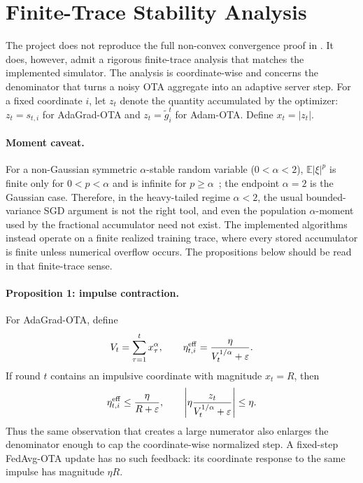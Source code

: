 \section{Finite-Trace Stability Analysis}
\label{sec:finite-trace-stability}
The project does not reproduce the full non-convex convergence proof in
\cite{wang2024adaptive}. It does, however, admit a rigorous finite-trace
analysis that matches the implemented simulator. The analysis is
coordinate-wise and concerns the denominator that turns a noisy OTA
aggregate into an adaptive server step. For a fixed coordinate $i$, let
$z_t$ denote the quantity accumulated by the optimizer: $z_t=s_{t,i}$ for
AdaGrad-OTA and $z_t=\tilde g^t_i$ for Adam-OTA. Define $x_t=|z_t|$.

\paragraph{Moment caveat.}
For a non-Gaussian symmetric $\alpha$-stable random variable
($0<\alpha<2$), $\mathbb{E}|\xi|^p$ is finite only for $0<p<\alpha$ and
is infinite for $p\geq\alpha$~\cite{nikias1995alphastable}; the endpoint
$\alpha=2$ is the Gaussian case. Therefore, in the heavy-tailed regime
$\alpha<2$, the usual bounded-variance SGD argument is not the right tool,
and even the population $\alpha$-moment used by the fractional accumulator
need not exist. The implemented algorithms instead operate on a finite
realized training trace, where every stored accumulator is finite unless
numerical overflow occurs. The propositions below should be read in that
finite-trace sense.

\paragraph{Proposition 1: impulse contraction.}
For AdaGrad-OTA, define
\begin{equation}
    V_t=\sum_{\tau=1}^{t} x_\tau^\alpha,
    \qquad
    \eta_{t,i}^{\rm eff}=\frac{\eta}{V_t^{1/\alpha}+\varepsilon}.
\end{equation}
If round $t$ contains an impulsive coordinate with magnitude $x_t=R$, then
\begin{equation}
    \eta_{t,i}^{\rm eff}\leq \frac{\eta}{R+\varepsilon},
    \qquad
    \left|\eta\frac{z_t}{V_t^{1/\alpha}+\varepsilon}\right|\leq \eta.
\end{equation}
Thus the same observation that creates a large numerator also enlarges the
denominator enough to cap the coordinate-wise normalized step. A fixed-step
FedAvg-OTA update has no such feedback: its coordinate response to the same
impulse has magnitude $\eta R$.

